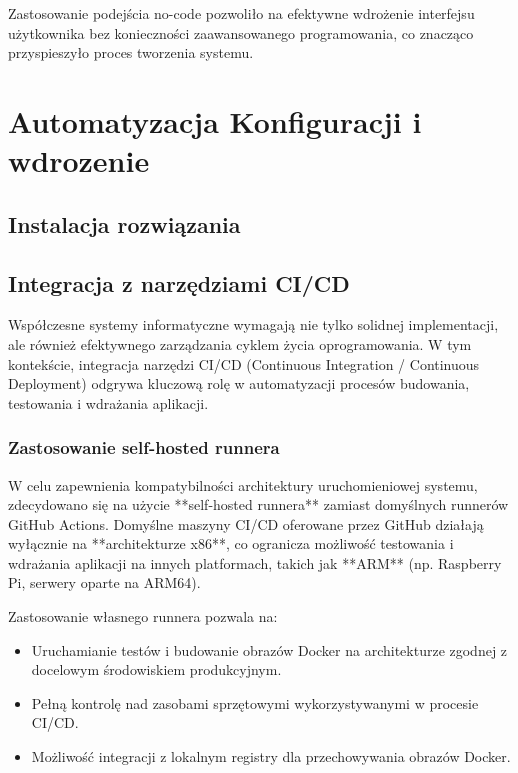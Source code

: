 Zastosowanie podejścia no-code pozwoliło na efektywne wdrożenie interfejsu użytkownika bez konieczności zaawansowanego programowania, co znacząco przyspieszyło proces tworzenia systemu.


\section{Automatyzacja Konfiguracji i wdrozenie}

\subsection{Instalacja rozwiązania}


\subsection{Integracja z narzędziami CI/CD}
\label{sec:integracja_ci_cd}

Współczesne systemy informatyczne wymagają nie tylko solidnej implementacji, ale również efektywnego zarządzania cyklem życia oprogramowania. W tym kontekście, integracja narzędzi CI/CD (Continuous Integration / Continuous Deployment) odgrywa kluczową rolę w automatyzacji procesów budowania, testowania i wdrażania aplikacji.

\subsubsection{Zastosowanie self-hosted runnera \cite{SelfHostRunner}}

W celu zapewnienia kompatybilności architektury uruchomieniowej systemu, zdecydowano się na użycie **self-hosted runnera** zamiast domyślnych runnerów GitHub Actions. Domyślne maszyny CI/CD oferowane przez GitHub działają wyłącznie na **architekturze x86**, co ogranicza możliwość testowania i wdrażania aplikacji na innych platformach, takich jak **ARM** (np. Raspberry Pi, serwery oparte na ARM64). 

Zastosowanie własnego runnera pozwala na:
\begin{itemize}
    \item Uruchamianie testów i budowanie obrazów Docker na architekturze zgodnej z docelowym środowiskiem produkcyjnym.
    \item Pełną kontrolę nad zasobami sprzętowymi wykorzystywanymi w procesie CI/CD.
    \item Możliwość integracji z lokalnym registry dla przechowywania obrazów Docker.
\end{itemize}


